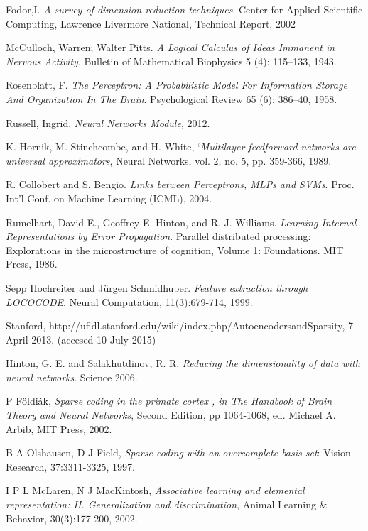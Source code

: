 \begin{thebibliography}{9}
Fodor,I. \emph{A survey of dimension reduction techniques}. Center for Applied Scientific Computing, Lawrence Livermore National, Technical Report, 2002



McCulloch, Warren; Walter Pitts. \emph{A Logical Calculus of Ideas Immanent in Nervous Activity}. Bulletin of Mathematical Biophysics 5 (4): 115–133, 1943.

Rosenblatt, F. \emph{The Perceptron: A Probabilistic Model For Information Storage And Organization In The Brain}. Psychological Review 65 (6): 386–40, 1958.

Russell, Ingrid. \emph{Neural Networks Module}, 2012.

K. Hornik, M. Stinchcombe, and H. White, `\emph{Multilayer feedforward networks are universal approximators}, Neural Networks, vol. 2, no. 5, pp. 359-366, 1989.

R. Collobert and S. Bengio. \emph{Links between Perceptrons, MLPs and SVMs}. Proc. Int'l Conf. on Machine Learning (ICML), 2004.

Rumelhart, David E., Geoffrey E. Hinton, and R. J. Williams. \emph{Learning Internal Representations by Error Propagation}. Parallel distributed processing: Explorations in the microstructure of cognition, Volume 1: Foundations. MIT Press, 1986.

Sepp Hochreiter and Jürgen Schmidhuber. \emph{Feature extraction through LOCOCODE}. 
Neural Computation, 11(3):679-714, 1999.


Stanford, http://ufldl.stanford.edu/wiki/index.php/Autoencoders\textunderscore and\textunderscore Sparsity, 7 April 2013, (accesed 10 July 2015)

Hinton, G. E. and Salakhutdinov, R. R. \emph{Reducing the dimensionality of data with neural networks}. Science 2006.

P F\"oldiák,  \emph{Sparse coding in the primate cortex , in The Handbook of Brain Theory and Neural Networks}, 
Second Edition, pp 1064-1068, ed. Michael A. Arbib, MIT Press, 2002.

B A Olshausen, D J Field, \emph{Sparse coding with an overcomplete basis set}: Vision Research, 37:3311-3325, 1997.

I P L McLaren, N J MacKintosh, \emph{Associative learning and elemental representation: II. Generalization and discrimination}, Animal Learning \& Behavior, 30(3):177-200, 2002.


\end{thebibliography}
